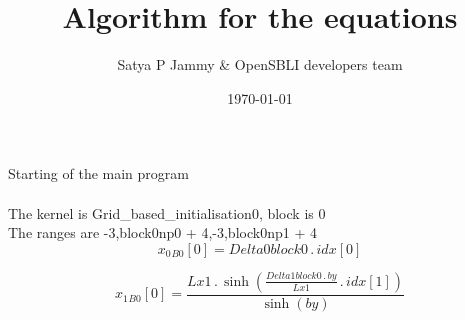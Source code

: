 \documentclass{article}
\title{Algorithm for the equations}
\author{Satya P Jammy \& OpenSBLI developers team}
\date{\today}
\begin{document}
\maketitle
\noindent Starting of the main program\\
\\\noindent The kernel is Grid_based_initialisation0, block is 0\\\noindent The ranges are -3,block0np0 + 4,-3,block0np1 + 4\\\begin{dmath}{x_{0}{_{B0}}}[{0}] = Delta0block0 \,.\, {idx}[{0}]\end{dmath}

\begin{dmath}{x_{1}{_{B0}}}[{0}] = \frac{Lx1 \,.\, \sinh{\left (\frac{Delta1block0 \,.\, by}{Lx1} \,.\, {idx}[{1}] \right )}}{\sinh{\left (by \right )}}\end{dmath}
\end{document}
